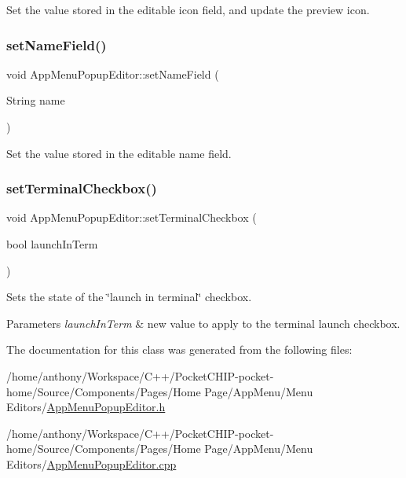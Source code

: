 Set the value stored in the editable icon field, and update the preview icon. \mbox{\label{classAppMenuPopupEditor_a14e47971d8a45d26199ef076bf163eee}} 
\subsubsection{\texorpdfstring{set\+Name\+Field()}{setNameField()}}
{\footnotesize\ttfamily void App\+Menu\+Popup\+Editor\+::set\+Name\+Field (\begin{DoxyParamCaption}\item[{String}]{name }\end{DoxyParamCaption})}

Set the value stored in the editable name field. \mbox{\label{classAppMenuPopupEditor_a630ae664010e259b64879642e637a4d2}} 
\subsubsection{\texorpdfstring{set\+Terminal\+Checkbox()}{setTerminalCheckbox()}}
{\footnotesize\ttfamily void App\+Menu\+Popup\+Editor\+::set\+Terminal\+Checkbox (\begin{DoxyParamCaption}\item[{bool}]{launch\+In\+Term }\end{DoxyParamCaption})}

Sets the state of the \char`\"{}launch in terminal\char`\"{} checkbox.


\begin{DoxyParams}{Parameters}
{\em launch\+In\+Term} & new value to apply to the terminal launch checkbox. \\
\hline
\end{DoxyParams}


The documentation for this class was generated from the following files\+:\begin{DoxyCompactItemize}
\item 
/home/anthony/\+Workspace/\+C++/\+Pocket\+C\+H\+I\+P-\/pocket-\/home/\+Source/\+Components/\+Pages/\+Home Page/\+App\+Menu/\+Menu Editors/\mbox{\hyperlink{AppMenuPopupEditor_8h}{App\+Menu\+Popup\+Editor.\+h}}\item 
/home/anthony/\+Workspace/\+C++/\+Pocket\+C\+H\+I\+P-\/pocket-\/home/\+Source/\+Components/\+Pages/\+Home Page/\+App\+Menu/\+Menu Editors/\mbox{\hyperlink{AppMenuPopupEditor_8cpp}{App\+Menu\+Popup\+Editor.\+cpp}}\end{DoxyCompactItemize}
